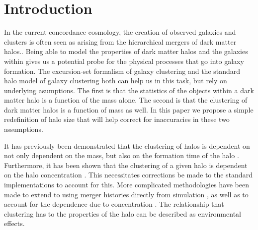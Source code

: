 \documentclass[usenatbib,usegraphicx,letterpaper]{mn2e}
\begin{document}

\section{Introduction}
\label{section:introduction}


In the current concordance cosmology, the creation of observed galaxies and clusters is often seen as arising from the hierarchical mergers of dark matter halos.\citep{white78}. Being able to model the properties of dark matter halos and the galaxies within gives us a potential probe for the physical processes that go into galaxy formation. The excursion-set formalism of galaxy clustering \citep{bond91,lacey93,somerville99, zentner06} and the standard halo model of galaxy clustering \citep{seljak00, peacock00, scoccimarro01, berlind02, bullock02, cooray02} both can help us in this task, but rely on underlying asumptions. The first is that the statistics of the objects within a dark matter halo is a function of the mass alone. The second is that the clustering of dark matter halos is a function of mass as well. In this paper we propose a simple redefinition of halo size that will help correct for inaccuracies in these two assumptions.

It has previously been demonstrated that the clustering of halos is dependent on not only dependent on the mass, but also on the formation time of the halo \citep{sheth04, gao05, croton07}. Furthermore, it has been shown that the clustering of a given halo is dependent on the halo concentration \citep{wechsler06}. This necessitates corrections be made to the standard implementations to account for this. More complicated methodologies have been made to extend to using merger histories directly from simulation \citep{dvorkin11}, as well as to account for the dependence due to concentration \citep{gil11}. The relationship that clustering has to the properties of the halo can be described as environmental effects.
\end{document}
